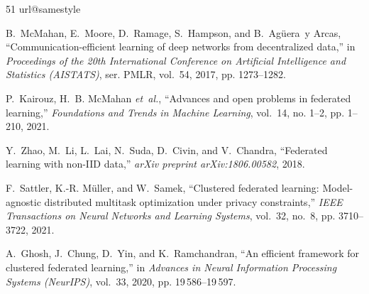 \documentclass[journal]{IEEEtran}
\theoremstyle{definition}
\begin{document}
\begin{thebibliography}{51}
\providecommand{\natexlab}[1]{#1}
\providecommand{\url}[1]{#1}
\csname url@samestyle\endcsname
\providecommand{\newblock}{\relax}
\providecommand{\bibinfo}[2]{#2}
\providecommand{\BIBentrySTDinterwordspacing}{\spaceskip=0pt\relax}
\providecommand{\BIBentryALTinterwordstretchfactor}{4}
\providecommand{\BIBentryALTinterwordspacing}{\spaceskip=\fontdimen2\font plus
\BIBentryALTinterwordstretchfactor\fontdimen3\font minus
  \fontdimen4\font\relax}
\providecommand{\BIBforeignlanguage}[2]{{%
\expandafter\ifx\csname l@#1\endcsname\relax
\typeout{** WARNING: IEEEtranN.bst: No hyphenation pattern has been}%
\typeout{** loaded for the language `#1'. Using the pattern for}%
\typeout{** the default language instead.}%
\else
\language=\csname l@#1\endcsname
\fi
#2}}
\providecommand{\BIBdecl}{\relax}
\BIBdecl

B.~McMahan, E.~Moore, D.~Ramage, S.~Hampson, and B.~Ag{\"u}era~y Arcas,
  ``Communication-efficient learning of deep networks from decentralized
  data,'' in \emph{Proceedings of the 20th International Conference on
  Artificial Intelligence and Statistics (AISTATS)}, ser. PMLR, vol.~54, 2017,
  pp. 1273--1282.

P.~Kairouz, H.~B. McMahan \emph{et~al.}, ``Advances and open problems in
  federated learning,'' \emph{Foundations and Trends in Machine Learning},
  vol.~14, no. 1--2, pp. 1--210, 2021.

Y.~Zhao, M.~Li, L.~Lai, N.~Suda, D.~Civin, and V.~Chandra, ``Federated learning
  with non-{IID} data,'' \emph{arXiv preprint arXiv:1806.00582}, 2018.

F.~Sattler, K.-R. M{\"u}ller, and W.~Samek, ``Clustered federated learning:
  Model-agnostic distributed multitask optimization under privacy
  constraints,'' \emph{IEEE Transactions on Neural Networks and Learning
  Systems}, vol.~32, no.~8, pp. 3710--3722, 2021.

A.~Ghosh, J.~Chung, D.~Yin, and K.~Ramchandran, ``An efficient framework for
  clustered federated learning,'' in \emph{Advances in Neural Information
  Processing Systems (NeurIPS)}, vol.~33, 2020, pp. 19\,586--19\,597.


\end{thebibliography}
\end{document}
